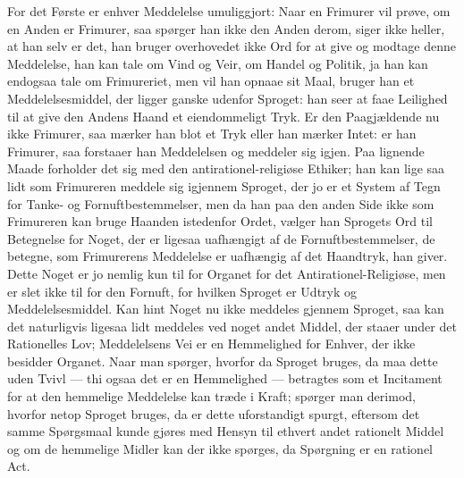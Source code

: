 For det Første er enhver Meddelelse umuliggjort: Naar en Frimurer vil prøve, om
en Anden er Frimurer, saa spørger han ikke den Anden derom, siger ikke heller,
at han selv er det, han bruger overhovedet ikke Ord for at give og modtage
denne Meddelelse, han kan tale om Vind og Veir, om Handel og Politik, ja han
kan endogsaa tale om Frimureriet, men vil han opnaae sit Maal, bruger han et
Meddelelsesmiddel, der ligger ganske udenfor Sproget: han seer at faae
Leilighed til at give den Andens Haand et eiendommeligt Tryk. Er den
Paagjældende nu ikke Frimurer, saa mærker han blot et Tryk eller han mærker
Intet: er han Frimurer, saa forstaaer han Meddelelsen og meddeler sig igjen.
Paa lignende Maade forholder det sig med den antirationel-religiøse Ethiker;
han kan lige saa lidt som Frimureren meddele sig igjennem Sproget, der jo er et
System af Tegn for Tanke- og Fornuftbestemmelser, men da han paa den anden Side
ikke som Frimureren kan bruge Haanden istedenfor Ordet, vælger han Sprogets Ord
til Betegnelse for Noget, der er ligesaa uafhængigt af de Fornuftbestemmelser,
de betegne, som Frimurerens Meddelelse er uafhængig af det Haandtryk, han
giver. Dette Noget er jo nemlig kun til for Organet for det
Antirationel-Religiøse, men er slet ikke til for den Fornuft, for hvilken
Sproget er Udtryk og Meddelelsesmiddel. Kan hint Noget nu ikke
meddeles gjennem Sproget, saa kan det naturligvis ligesaa lidt
meddeles ved noget andet Middel, der staaer under det Rationelles Lov;
Meddelelsens Vei er en Hemmelighed for Enhver, der ikke besidder Organet. Naar
man spørger, hvorfor da Sproget bruges, da maa dette uden Tvivl --- thi ogsaa
det er en Hemmelighed --- betragtes som et Incitament for at den hemmelige
Meddelelse kan træde i Kraft; spørger man derimod, hvorfor netop Sproget
bruges, da er dette uforstandigt spurgt, eftersom det samme Spørgsmaal kunde
gjøres med Hensyn til ethvert andet rationelt Middel og om de hemmelige Midler
kan der ikke spørges, da Spørgning er en rationel Act.

